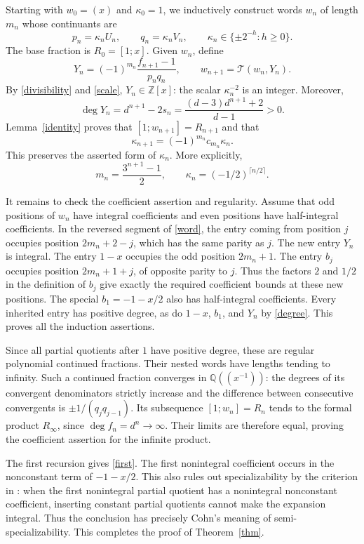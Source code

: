 \documentclass[11pt]{article}
\newcommand{\ZZ}{\mathbb Z}
\newcommand{\QQ}{\mathbb Q}
\begin{document}
Starting with $w_0=(x)$ and $\kappa_0=1$, we inductively construct words
$w_n$ of length $m_n$ whose continuants are
\begin{equation}\label{scale}
 p_n=\kappa_n U_n,\qquad q_n=\kappa_n V_n,
 \qquad \kappa_n\in\{\pm2^{-h}:h\geq0\}.
\end{equation}
The base fraction is $R_0=[1;x]$.
Given $w_n$, define
\begin{equation}\label{Y}
 Y_n=(-1)^{m_n}\frac{f_{n+1}-1}{p_nq_n},\qquad
 w_{n+1}=\mathcal T(w_n,Y_n).
\end{equation}
By \eqref{divisibility} and \eqref{scale}, $Y_n\in\ZZ[x]$:
the scalar $\kappa_n^{-2}$ is an integer. Moreover,
\begin{equation}\label{degree}
 \deg Y_n=d^{n+1}-2s_n
 =\frac{(d-3)d^{n+1}+2}{d-1}>0.
\end{equation}
Lemma~\ref{identity} proves that $[1;w_{n+1}]=R_{n+1}$ and that
\[
 \kappa_{n+1}=(-1)^{m_n}c_{m_n}\kappa_n.
\]
This preserves the asserted form of $\kappa_n$. More explicitly,
\[
 m_n=\frac{3^{n+1}-1}{2},\qquad
 \kappa_n=(-1/2)^{\lceil n/2\rceil}.
\]

It remains to check the coefficient assertion and regularity.
Assume that odd positions of $w_n$ have integral coefficients and even
positions have half-integral coefficients. In the reversed segment of
\eqref{word}, the entry coming from position $j$ occupies position
$2m_n+2-j$, which has the same parity as $j$. The new entry $Y_n$ is
integral. The entry $1-x$ occupies the odd position $2m_n+1$.
The entry $b_j$ occupies position $2m_n+1+j$, of opposite parity to $j$.
Thus the factors $2$ and $1/2$ in the definition of $b_j$ give exactly
the required coefficient bounds at these new positions. The special
$b_1=-1-x/2$ also has half-integral coefficients.
Every inherited entry has positive degree, as do $1-x$, $b_1$, and
$Y_n$ by \eqref{degree}. This proves all the induction assertions.

Since all partial quotients after $1$ have positive degree, these are
regular polynomial continued fractions. Their nested words have lengths
tending to infinity. Such a continued fraction converges in
$\QQ((x^{-1}))$: the degrees of its convergent denominators strictly
increase and the difference between consecutive convergents is
$\pm1/(q_jq_{j-1})$. Its subsequence $[1;w_n]=R_n$ tends to the formal
product $R_\infty$, since $\deg f_n=d^n\to\infty$. Their limits are
therefore equal, proving the coefficient assertion for the infinite
product.

The first recursion gives \eqref{first}. The first nonintegral coefficient
occurs in the nonconstant term of $-1-x/2$. This also rules out
specializability by the criterion in \cite[Section 7, p.~308]{C}:
when the first nonintegral partial quotient has a nonintegral nonconstant
coefficient, inserting constant partial quotients cannot make the expansion
integral. Thus the conclusion has precisely Cohn's meaning of
semi-specializability. This completes the proof of Theorem~\ref{thm}.
\end{document}
